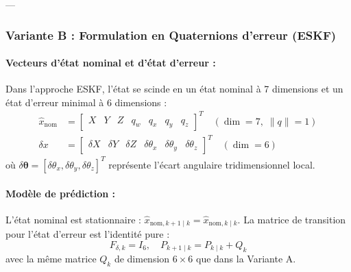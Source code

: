 \documentclass[../Formulations_Kalman.tex]{subfiles}
\begin{document}
---

\subsubsection{Variante B : Formulation en Quaternions d'erreur (ESKF)}

\paragraph{Vecteurs d'état nominal et d'état d'erreur :}
Dans l'approche ESKF, l'état se scinde en un état nominal à 7 dimensions et un état d'erreur minimal à 6 dimensions :
\begin{align}
\hat{x}_{\text{nom}} &= \begin{bmatrix} X & Y & Z & q_w & q_x & q_y & q_z \end{bmatrix}^T \quad (\dim = 7, \; \|q\|=1) \\
\delta x &= \begin{bmatrix} \delta X & \delta Y & \delta Z & \delta\theta_x & \delta\theta_y & \delta\theta_z \end{bmatrix}^T \quad (\dim = 6)
\end{align}
où $\delta\boldsymbol{\theta} = [\delta\theta_x, \delta\theta_y, \delta\theta_z]^T$ représente l'écart angulaire tridimensionnel local.

\paragraph{Modèle de prédiction :}
L'état nominal est stationnaire : $\hat{x}_{\text{nom}, k+1\mid k} = \hat{x}_{\text{nom}, k\mid k}$.
La matrice de transition pour l'état d'erreur est l'identité pure :
\begin{equation}
F_{\delta, k} = I_6, \quad P_{k+1\mid k} = P_{k\mid k} + Q_k
\end{equation}
avec la même matrice $Q_k$ de dimension $6 \times 6$ que dans la Variante A.
\end{document}
